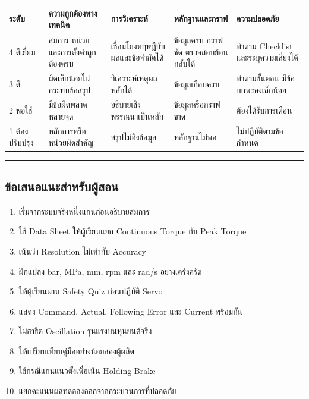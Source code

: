 \begin{table}[htbp]
    \centering
    \begin{tabular}{l l l l l}
        \hline
        \textbf{ระดับ} & \textbf{ความถูกต้องทางเทคนิค} & \textbf{การวิเคราะห์} & \textbf{หลักฐานและกราฟ} & \textbf{ความปลอดภัย} \\
        \hline
        4 ดีเยี่ยม & สมการ หน่วย และการตั้งค่าถูกต้องครบ & เชื่อมโยงทฤษฎีกับผลและข้อจำกัดได้ & ข้อมูลครบ กราฟชัด ตรวจสอบย้อนกลับได้ & ทำตาม Checklist และระบุความเสี่ยงได้ \\
        3 ดี & ผิดเล็กน้อยไม่กระทบข้อสรุป & วิเคราะห์เหตุผลหลักได้ & ข้อมูลเกือบครบ & ทำตามขั้นตอน มีข้อบกพร่องเล็กน้อย \\
        2 พอใช้ & มีข้อผิดพลาดหลายจุด & อธิบายเชิงพรรณนาเป็นหลัก & ข้อมูลหรือกราฟขาด & ต้องได้รับการเตือน \\
        1 ต้องปรับปรุง & หลักการหรือหน่วยผิดสำคัญ & สรุปไม่อิงข้อมูล & หลักฐานไม่พอ & ไม่ปฏิบัติตามข้อกำหนด \\
        \hline
    \end{tabular}
\end{table}

\par\noindent\rule{\textwidth}{0.4pt}\par

\subsection{ข้อเสนอแนะสำหรับผู้สอน}

\begin{enumerate}
    \item เริ่มจากระบบจริงหนึ่งแกนก่อนอธิบายสมการ
    \item ใช้ Data Sheet ให้ผู้เรียนแยก Continuous Torque กับ Peak Torque
    \item เน้นว่า Resolution ไม่เท่ากับ Accuracy
    \item ฝึกแปลง bar, MPa, mm, rpm และ rad/s อย่างเคร่งครัด
    \item ให้ผู้เรียนผ่าน Safety Quiz ก่อนปฏิบัติ Servo
    \item แสดง Command, Actual, Following Error และ Current พร้อมกัน
    \item ไม่สาธิต Oscillation รุนแรงบนหุ่นยนต์จริง
    \item ให้เปรียบเทียบคู่มืออย่างน้อยสองผู้ผลิต
    \item ใช้กรณีแกนแนวตั้งเพื่อเน้น Holding Brake
    \item แยกคะแนนผลทดลองออกจากกระบวนการที่ปลอดภัย
\end{enumerate}

